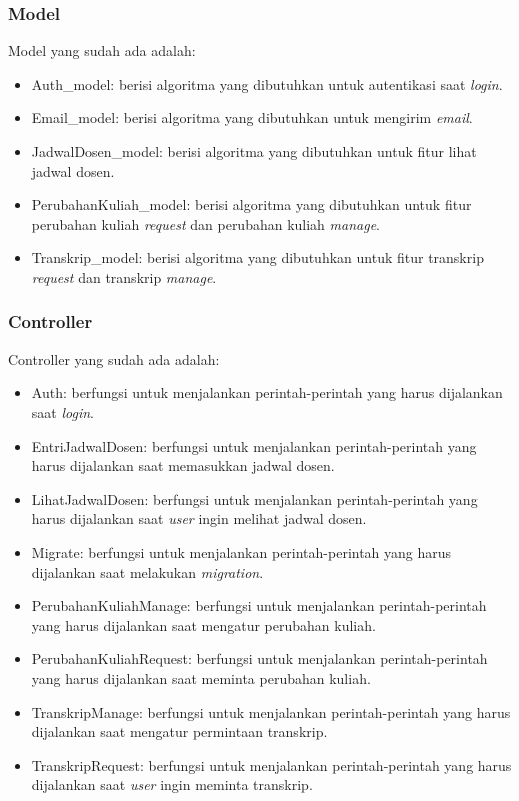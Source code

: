 \subsubsection{Model}
Model yang sudah ada adalah:
\begin{itemize}
	\item Auth\_model: berisi algoritma yang dibutuhkan untuk autentikasi saat \textit{login}.
	\item Email\_model: berisi algoritma yang dibutuhkan untuk mengirim \textit{email}.
	\item JadwalDosen\_model: berisi algoritma yang dibutuhkan untuk fitur lihat jadwal dosen.
	\item PerubahanKuliah\_model: berisi algoritma yang dibutuhkan untuk fitur perubahan kuliah \textit{request} dan perubahan kuliah \textit{manage}.
	\item Transkrip\_model: berisi algoritma yang dibutuhkan untuk fitur transkrip \textit{request} dan transkrip \textit{manage}.
\end{itemize} 

\subsubsection{Controller}
Controller yang sudah ada adalah:
\begin{itemize}
	\item Auth: berfungsi untuk menjalankan perintah-perintah yang harus dijalankan saat \textit{login}.
	\item EntriJadwalDosen: berfungsi untuk menjalankan perintah-perintah yang harus dijalankan saat memasukkan jadwal dosen.
	\item LihatJadwalDosen: berfungsi untuk menjalankan perintah-perintah yang harus dijalankan saat \textit{user} ingin melihat jadwal dosen.
	\item Migrate: berfungsi untuk menjalankan perintah-perintah yang harus dijalankan saat melakukan \textit{migration}.
	\item PerubahanKuliahManage: berfungsi untuk menjalankan perintah-perintah yang harus dijalankan saat mengatur perubahan kuliah.
	\item PerubahanKuliahRequest: berfungsi untuk menjalankan perintah-perintah yang harus dijalankan saat meminta perubahan kuliah.
	\item TranskripManage: berfungsi untuk menjalankan perintah-perintah yang harus dijalankan saat mengatur permintaan transkrip.
	\item TranskripRequest: berfungsi untuk menjalankan perintah-perintah yang harus dijalankan saat \textit{user} ingin meminta transkrip.
\end{itemize} 

